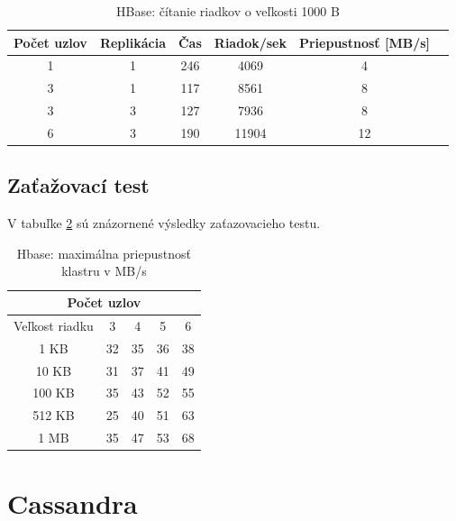 \documentclass[11pt,twoside,a4paper]{book}
\begin{document}
\begin{table}[hp]
\begin{center}
\begin{tabular}{|c|c|c|c|c|c|}

\hline Počet uzlov & Replikácia & Čas & Riadok/sek & Priepustnosť [MB/s]\\ 
\hline
\hline 1 & 1 & 246 & 4069 & 4\\ 
\hline 3 & 1 & 117 & 8561 & 8\\ 
\hline 3 & 3 & 127 & 7936 & 8\\ 
\hline 6 & 3 & 190 & 11904 & 12\\ 
\hline
\end{tabular} 
\end{center}
\caption{HBase: čítanie riadkov o veľkosti 1000 B}
\label{tab:HPerf2}
\end{table}

\subsection*{Zaťažovací test}

V tabuľke \ref{tab:HPerf3} sú znázornené výsledky zaťazovacieho testu.

\begin{table}[htp]
\begin{center}
\begin{tabular}{|c|c|c|c|c|}
\hline
\multicolumn{5}{|c|}{Počet uzlov}  \\
\hline Veľkost riadku & 3 & 4 & 5 & 6\\ 
\hline
\hline 1 KB & 32 & 35 & 36 & 38\\ 
\hline 10 KB & 31 & 37 & 41 & 49 \\ 
\hline 100 KB & 35 & 43 & 52 & 55\\ 
\hline 512 KB & 25 & 40 & 51 & 63 \\  
\hline 1 MB & 35 & 47 & 53 & 68 \\ 
\hline
\end{tabular} 
\end{center}
\caption{Hbase: maximálna priepustnosť klastru v MB/s}
\label{tab:HPerf3}
\end{table}



\section{Cassandra}
\end{document}
